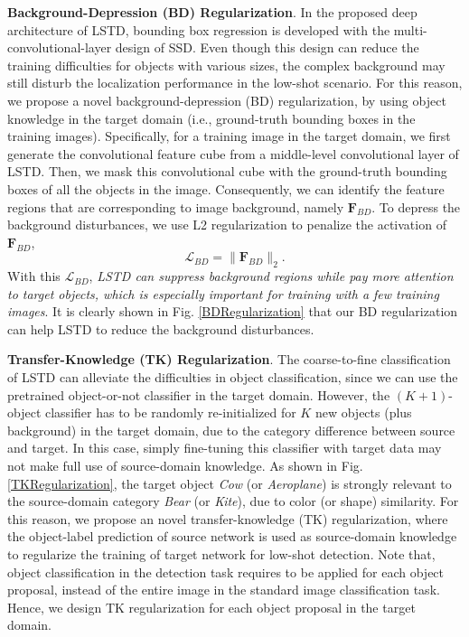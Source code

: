 \documentclass[letterpaper]{article} \usepackage{aaai18}  \usepackage{times}  \usepackage{helvet}  \usepackage{courier}  \usepackage{url}  \usepackage{graphicx}
\begin{document}
\textbf{Background-Depression (BD) Regularization}.
In the proposed deep architecture of LSTD,
bounding box regression is developed with the multi-convolutional-layer design of SSD.
Even though this design can reduce the training difficulties for objects with various sizes,
the complex background may still disturb the localization performance in the low-shot scenario.
For this reason,
we propose a novel background-depression (BD) regularization,
by using object knowledge in the target domain (i.e., ground-truth bounding boxes in the training images).
Specifically,
for a training image in the target domain,
we first generate the convolutional feature cube from a middle-level convolutional layer of LSTD.
Then,
we mask this convolutional cube with the ground-truth bounding boxes of all the objects in the image.
Consequently,
we can identify the feature regions that are corresponding to image background,
namely $\mathbf{F}_{BD}$.
To depress the background disturbances,
we use L2 regularization to penalize the activation of $\mathbf{F}_{BD}$,
\begin{equation}
\mathcal{L}_{BD}=\|\mathbf{F}_{BD}\|_{2}.
\label{eq:BDregularization}
\end{equation}
With this $\mathcal{L}_{BD}$,
\textit{LSTD can suppress background regions while pay more attention to target objects,
which is especially important for training with a few training images}.
It is clearly shown in Fig. \ref{BDRegularization} that our BD regularization can help LSTD to reduce the background disturbances.




\textbf{Transfer-Knowledge (TK) Regularization}.
The coarse-to-fine classification of LSTD can alleviate the difficulties in object classification,
since we can use the pretrained object-or-not classifier in the target domain.
However,
the $(K+1)$-object classifier has to be randomly re-initialized for $K$ new objects (plus background) in the target domain,
due to the category difference between source and target.
In this case,
simply fine-tuning this classifier with target data may not make full use of source-domain knowledge.
As shown in Fig. \ref{TKRegularization},
the target object \textit{Cow} (or \textit{Aeroplane}) is strongly relevant to the source-domain category \textit{Bear} (or \textit{Kite}),
due to color (or shape) similarity.
For this reason,
we propose an novel transfer-knowledge (TK) regularization,
where
the object-label prediction of source network is used as source-domain knowledge to regularize the training of target network for low-shot detection.
Note that,
object classification in the detection task requires to be applied for each object proposal,
instead of the entire image in the standard image classification task.
Hence,
we design TK regularization for each object proposal in the target domain.
\end{document}

